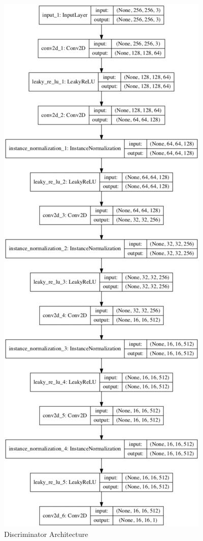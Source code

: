 \begin{figure}
  \centering
  \includegraphics[height=1.25\textwidth]{img/discriminator_new.png}
  \caption{Discriminator Architecture }
  \label{Discriminator Architecture}
\end{figure}

